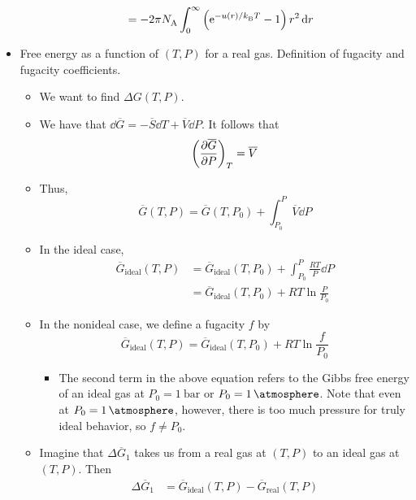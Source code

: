 \documentclass[../notes.tex]{subfiles}
\begin{document}
\begin{itemize}
\begin{itemize}
\begin{align*}
            &= -2\pi\NA\int_0^\infty\left( \e[-u(r)/\kB T]-1 \right)r^2\dd{r}
        \end{align*}
    \end{itemize}
    \item Free energy as a function of $(T,P)$ for a real gas. Definition of fugacity and fugacity coefficients.
    \begin{itemize}
        \item We want to find $\Delta G(T,P)$.
        \item We have that $\dd{\overline{G}}=-\overline{S}\dd{T}+\overline{V}\dd{P}$. It follows that
        \begin{equation*}
            \left( \pdv{\overline{G}}{P} \right)_T = \overline{V}
        \end{equation*}
        \item Thus,
        \begin{equation*}
            \overline{G}(T,P) = \overline{G}(T,P_0)+\int_{P_0}^P\overline{V}\dd{P}
        \end{equation*}
        \item In the ideal case,
        \begin{align*}
            \overline{G}_\text{ideal}(T,P) &= \overline{G}_\text{ideal}(T,P_0)+\int_{P_0}^P\frac{RT}{P}\dd{P}\\
            &= \overline{G}_\text{ideal}(T,P_0)+RT\ln\frac{P}{P_0}
        \end{align*}
        \item In the nonideal case, we define a fugacity $f$ by
        \begin{equation*}
            \overline{G}_\text{ideal}(T,P) = \overline{G}_\text{ideal}(T,P_0)+RT\ln\frac{f}{P_0}
        \end{equation*}
        \begin{itemize}
            \item The second term in the above equation refers to the Gibbs free energy of an ideal gas at $P_0=\SI{1}{\bar}$ or $P_0=\SI{1}{\atmosphere}$. Note that even at $P_0=\SI{1}{\atmosphere}$, however, there is too much pressure for truly ideal behavior, so $f\neq P_0$.
        \end{itemize}
        \item Imagine that $\Delta\overline{G}_1$ takes us from a real gas at $(T,P)$ to an ideal gas at $(T,P)$. Then
        \begin{align*}
            \Delta\overline{G}_1 &= \overline{G}_\text{ideal}(T,P)-\overline{G}_\text{real}(T,P)\\

\end{align*}
\end{itemize}
\end{itemize}
\end{document}
